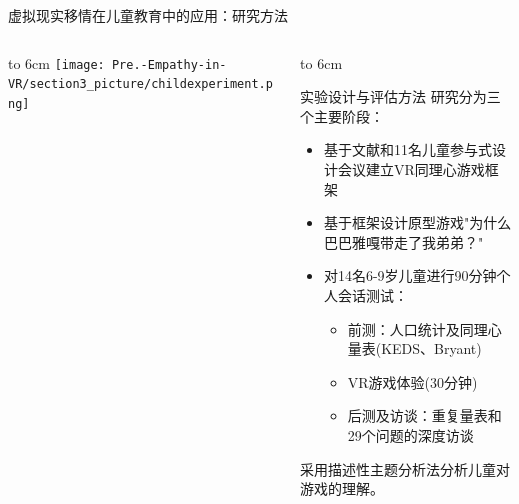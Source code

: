 \documentclass[aspectratio=169,xcolor=dvipsnames]{beamer}
\begin{document}
\begin{frame}{虚拟现实移情在儿童教育中的应用：研究方法}
    \begin{columns}[T]
        \begin{column}{0.45\textwidth}
            \vbox to 6cm{
                \vfill
                \centering
                \texttt{[image: Pre.-Empathy-in-VR/section3\_picture/childexperiment.png]}
                \vfill
            }
        \end{column}
        
        \begin{column}{0.55\textwidth}
            \vbox to 6cm{
                \vspace{-0.5cm} %
                \begin{block}{实验设计与评估方法}
                    研究分为三个主要阶段：
                \begin{itemize}
                    \item 基于文献和11名儿童参与式设计会议建立VR同理心游戏框架
                    \item 基于框架设计原型游戏"为什么巴巴雅嘎带走了我弟弟？"
                    \item 对14名6-9岁儿童进行90分钟个人会话测试：
                        \begin{itemize}
                            \item 前测：人口统计及同理心量表(KEDS、Bryant)
                            \item VR游戏体验(30分钟)
                            \item 后测及访谈：重复量表和29个问题的深度访谈
                        \end{itemize}
                \end{itemize}
                
                采用描述性主题分析法分析儿童对游戏的理解。
                \end{block}
                \vfill
            }
        \end{column}
    \end{columns}
\end{frame}
\end{document}
